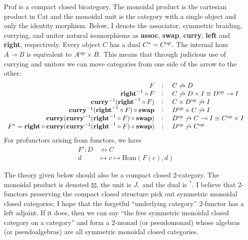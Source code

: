 \documentclass[12pt,twoside,openright]{report}
\newcommand{\maps}{\colon}
\newcommand{\lhom}{\multimap}
\newcommand{\op}{{\rm op}}
\newcommand{\mbold}[1]{\mbox{\bf #1}}
\newcommand{\Hom}{\mbox{Hom}}
\begin{document}
Prof is a compact closed bicategory.  The monoidal product is the cartesian product in Cat and the monoidal unit is the category with a single object and only the identity morphism.  Below, I denote the associator, symmetric braiding, currying, and unitor natural isomorphisms as \textbf{assoc}, \textbf{swap}, \textbf{curry}, \textbf{left} and \textbf{right}, respectively.  Every object $C$ has a dual $C^* = C^{\op}.$  The internal hom $A \lhom B$ is equivalent to $A^{\op} \times B.$  This means that through judicious use of currying and unitors we can move categories from one side of the arrow to the other:
\[ \begin{array}{rcl}
  F& \maps & C \not\to D \\
  \mbold{right}^{-1} \circ F& \maps & C \not\to D \times I \equiv D^{\op} \lhom I \\
  \mbold{curry}^{-1}(\mbold{right}^{-1} \circ F)& \maps & C \times D^{\op} \not\to I \\
  \mbold{curry}^{-1}(\mbold{right}^{-1} \circ F) \circ \mbold{swap}& \maps & D^{\op} \times C \not\to I \\
  \mbold{curry}(\mbold{curry}^{-1}(\mbold{right}^{-1} \circ F) \circ \mbold{swap})& \maps & D^{\op} \not\to C \lhom I \equiv C^{\op} \times I \\
  F^* = \mbold{right} \circ \mbold{curry}(\mbold{curry}^{-1}(\mbold{right}^{-1} \circ F) \circ \mbold{swap})& \maps & D^{\op} \not\to C^{\op}
\end{array} \]
For profunctors arising from functors, we have
\[ \begin{array}{rl}F'\maps D &\not\to C \\ d &\mapsto c \mapsto \Hom(F(c), d)\end{array} \]

The theory given below should also be a compact closed 2-category.  The monoidal product is denoted $\boxtimes$, the unit is $J,$ and the dual is ${}^*.$  I believe that 2-functors preserving the compact closed structure pick out symmetric monoidal closed categories; I hope that the forgetful ``underlying category'' 2-functor has a left adjoint.  If it does, then we can say ``the free symmetric monoidal closed category on a category'' and form a 2-monad (or pseudomonad) whose algebras (or pseudoalgebras) are all symmetric monoidal closed categories.
\end{document}
